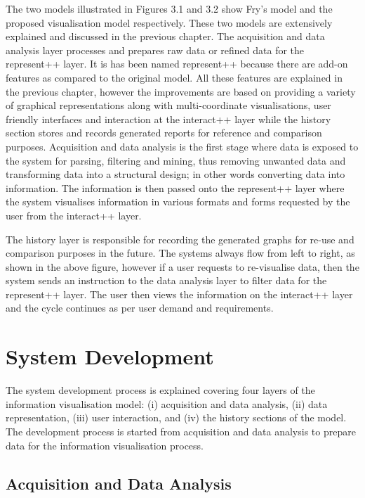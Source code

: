 The two models illustrated in Figures 3.1 and 3.2 show  Fry's model \cite{fry} and the proposed visualisation model respectively. These two models are extensively explained and discussed in the previous chapter. The acquisition and data analysis layer processes and prepares raw data or refined data for the represent++ layer. It is has been named represent++ because there are add-on features as compared to the original model.  All these features are explained in the previous chapter, however the improvements are based on providing a variety of graphical representations along with multi-coordinate visualisations, user friendly interfaces and interaction at the interact++ layer while the history section stores and records generated reports for reference and comparison purposes. Acquisition and data analysis is the first stage where data is exposed to the system for parsing, filtering and mining, thus removing unwanted data and transforming data into a structural design; in other words converting data into information. The information is then passed onto the represent++ layer where the system visualises information in various formats and forms requested by the user from the interact++ layer.

The history layer is responsible for recording the generated graphs for re-use and comparison purposes in the future. The systems always flow from left to right, as shown in the above figure, however if a user requests to re-visualise data, then the system sends an instruction to the data analysis layer to filter data for the represent++ layer. The user then views the information on the interact++ layer and the cycle continues as per user demand and requirements.

\section{System Development}

The system development process is explained covering four layers of the information visualisation model:  (i) acquisition and data analysis, (ii) data representation, (iii) user interaction, and (iv) the history sections of the model. The development process is started from acquisition and data analysis to prepare data for the information visualisation process.

\subsection{Acquisition and Data Analysis}

